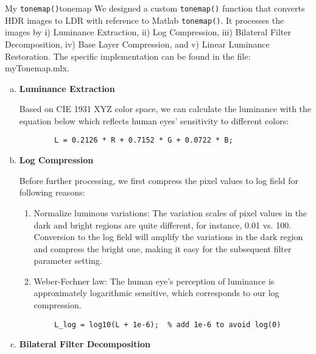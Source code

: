 \begin{problem}{My \texttt{tonemap()}}{tonemap}
    We designed a custom \texttt{tonemap()} function that converts HDR images to LDR with reference to Matlab \texttt{tonemap()}. It processes the images by i) Luminance Extraction, ii) Log Compression, iii) Bilateral Filter Decomposition, iv) Base Layer Compression, and v) Linear Luminance Restoration. The specific implementation can be found in the file: myTonemap.mlx.

\begin{enumerate}[(a)]
    \item \textbf{Luminance Extraction}
    
        Based on CIE 1931 XYZ color space, we can calculate the luminance with the equation below which reflects human eyes' sensitivity to different colors:
        \begin{verbatim}
        L = 0.2126 * R + 0.7152 * G + 0.0722 * B;
        \end{verbatim}
   
    \item \textbf{Log Compression}
    
        Before further processing, we first compress the pixel values to log field for following reasons:
        \begin{enumerate}[label = (\roman*)]
            \item Normalize luminous variations: The variation scales of pixel values in the dark and bright regions are quite different, for instance, 0.01 vs. 100. Conversion to the log field will amplify the variations in the dark region and compress the bright one, making it easy for the subsequent filter parameter setting.
            \item Weber-Fechner law: The human eye's perception of luminance is approximately logarithmic sensitive, which corresponds to our log compression. 
        \end{enumerate}
        \begin{verbatim}
        L_log = log10(L + 1e-6);  % add 1e-6 to avoid log(0)
        \end{verbatim}

    \item \textbf{Bilateral Filter Decomposition}


\end{enumerate}
\end{problem}
